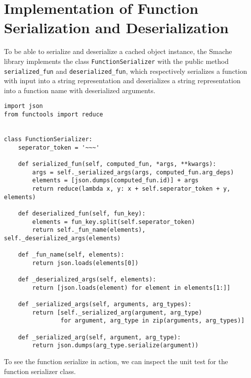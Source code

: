 \section{Implementation of Function Serialization and Deserialization}
\label{appendix:implementation-of-function-serialization-and-deserialization}

To be able to serialize and deserialize a cached object instance, the Smache library implements the class \verb$FunctionSerializer$ with the public method \verb$serialized_fun$ and \verb$deserialized_fun$, which respectively serializes a function with input into a string representation and deserializes a string representation into a function name with deserialized arguments.

\begin{verbatim}
import json
from functools import reduce


class FunctionSerializer:
    seperator_token = '~~~'

    def serialized_fun(self, computed_fun, *args, **kwargs):
        args = self._serialized_args(args, computed_fun.arg_deps)
        elements = [json.dumps(computed_fun.id)] + args
        return reduce(lambda x, y: x + self.seperator_token + y, elements)

    def deserialized_fun(self, fun_key):
        elements = fun_key.split(self.seperator_token)
        return self._fun_name(elements), self._deserialized_args(elements)

    def _fun_name(self, elements):
        return json.loads(elements[0])

    def _deserialized_args(self, elements):
        return [json.loads(element) for element in elements[1:]]

    def _serialized_args(self, arguments, arg_types):
        return [self._serialized_arg(argument, arg_type)
                for argument, arg_type in zip(arguments, arg_types)]

    def _serialized_arg(self, argument, arg_type):
        return json.dumps(arg_type.serialize(argument))
\end{verbatim}

To see the function serialize in action, we can inspect the unit test for the function serializer class.

